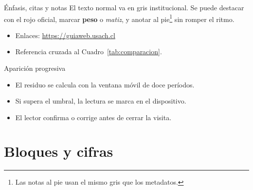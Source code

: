 \documentclass[11pt,aspectratio=169,xcolor=table]{beamer}
\begin{document}
\begin{frame}{Énfasis, citas y notas}
  El texto normal va en gris institucional. Se puede \alert{destacar con el rojo
  oficial}, marcar \textbf{peso} o \emph{matiz}, y anotar al pie\footnote{Las
  notas al pie usan el mismo gris que los metadatos.} sin romper el ritmo.


  \begin{itemize}
    \item Enlaces: \url{https://guiaweb.usach.cl}
    \item Referencia cruzada al Cuadro~\ref{tab:comparacion}.
  \end{itemize}
\end{frame}

\begin{frame}{Aparición progresiva}
  \begin{itemize}\usachaire
    \item<1-> El residuo se calcula con la ventana móvil de doce períodos.
    \item<2-> Si supera el umbral, la lectura se marca en el dispositivo.
    \item<3-> El lector confirma o corrige antes de cerrar la visita.
  \end{itemize}
\end{frame}

\section{Bloques y cifras}
\end{document}
